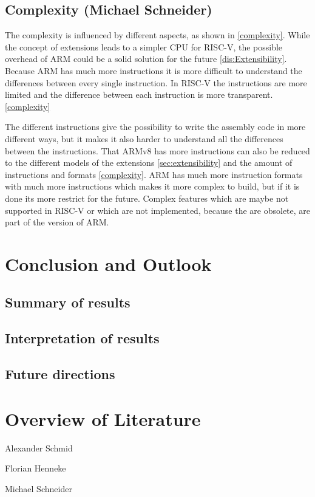 \documentclass[conference]{IEEEtran}
\begin{document}
	\subsection{Complexity (Michael Schneider)}
The complexity is influenced by different aspects, as shown in \ref{complexity}.
While the concept of extensions leads to a simpler CPU for RISC-V, the possible overhead of ARM could be a solid solution for the future \ref{dis:Extensibility}.
	Because ARM has much more instructions it is more difficult to understand the differences between every single instruction. In RISC-V the instructions are more limited and the difference between each instruction is more transparent. \ref{complexity}
	
	The different instructions give the possibility to write the assembly code in more different ways, but it makes it also harder to understand all the differences between the instructions. That ARMv8 has more instructions can also be reduced to the different models of the extensions \ref{sec:extensibility} and the amount of instructions and formats \ref{complexity}.
ARM has much more instruction formats with much more instructions which makes it more complex to build, but if it is done its more restrict for the future. Complex features which are maybe not supported in RISC-V or which are not implemented, because the are obsolete, are part of the version of ARM. \cite{Waterman2017} \cite{Arm2020}

\section{Conclusion and Outlook}
\label{ref:conclusion}
	\subsection{Summary of results}
	\subsection{Interpretation of results}
	\subsection{Future directions}


\section{Overview of Literature}
Alexander Schmid \cite{Akram2017} \cite{Arm2020} \cite{Asanovic2014} \cite{HeuiLee2001} \cite{Patterson2019} \cite{Perotti2020} \cite{Shore2015} \cite{Waterman2016} \cite{Xu2003}

Florian Henneke \cite{Waterman2016} \cite{Ryzhyk2006} \cite{Asanovic2014} \cite{Furber2000} \cite{Microsoft2020} \cite{Greenwaves2020} \cite{Aws2020} \cite{Microsoft2020}

Michael Schneider \cite{Waterman2017} \cite{Arm2020} \cite{George1990} \cite{Waterman2016} \cite{50years} \cite{hennessy2012computer} \cite{drechsler2020enhanced} \cite{WisconsinMadison2016} \cite{IEEE2018} \cite{Dirvin2019} \cite{Bandic2019} \cite{Berkeley2019}



\end{document}
